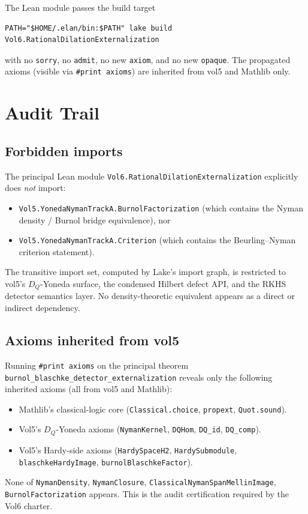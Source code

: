 \documentclass[12pt]{article}
\theoremstyle{plain}
\theoremstyle{definition}
\theoremstyle{remark}
\newcommand{\DQ}{D_{Q}}
\begin{document}
The Lean module passes the build target
\begin{verbatim}
PATH="$HOME/.elan/bin:$PATH" lake build Vol6.RationalDilationExternalization
\end{verbatim}
with no \texttt{sorry}, no \texttt{admit}, no new \texttt{axiom}, and no
new \texttt{opaque}.  The propagated axioms (visible via
\texttt{\#print axioms}) are inherited from vol5 and Mathlib only.

\section{Audit Trail}
\label{sec:audit}

\subsection{Forbidden imports}

The principal Lean module
\texttt{Vol6.RationalDilationExternalization} explicitly does
\emph{not} import:
\begin{itemize}
  \item \texttt{Vol5.YonedaNymanTrackA.BurnolFactorization} (which
    contains the Nyman density / Burnol bridge equivalence), nor
  \item \texttt{Vol5.YonedaNymanTrackA.Criterion} (which contains the
    Beurling--Nyman criterion statement).
\end{itemize}
The transitive import set, computed by Lake's import graph, is
restricted to vol5's $\DQ$-Yoneda surface, the condensed Hilbert
defect API, and the RKHS detector semantics layer.  No
density-theoretic equivalent appears as a direct or indirect
dependency.

\subsection{Axioms inherited from vol5}

Running \texttt{\#print axioms} on the principal theorem
\texttt{burnol\_blaschke\_detector\_externalization} reveals only the
following inherited axioms (all from vol5 and Mathlib):
\begin{itemize}
  \item Mathlib's classical-logic core
    (\texttt{Classical.choice}, \texttt{propext},
    \texttt{Quot.sound}).
  \item Vol5's $\DQ$-Yoneda axioms
    (\texttt{NymanKernel}, \texttt{DQHom}, \texttt{DQ\_id},
    \texttt{DQ\_comp}).
  \item Vol5's Hardy-side axioms
    (\texttt{HardySpaceH2}, \texttt{HardySubmodule},
    \texttt{blaschkeHardyImage}, \texttt{burnolBlaschkeFactor}).
\end{itemize}
None of \texttt{NymanDensity}, \texttt{NymanClosure},
\texttt{ClassicalNymanSpanMellinImage}, \texttt{BurnolFactorization}
appears.  This is the audit certification required by the Vol6
charter.
\end{document}
